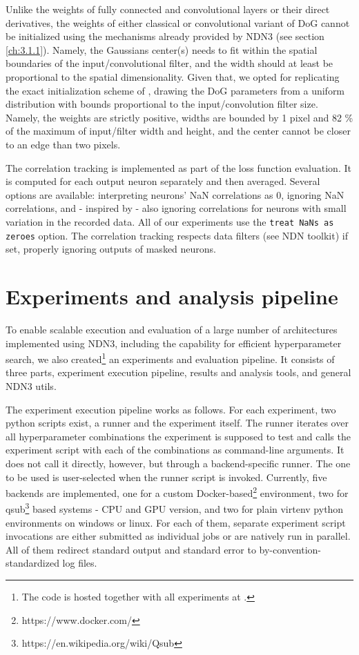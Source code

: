 Unlike the weights of fully connected and convolutional layers or their direct derivatives, the weights of either classical or convolutional variant of DoG cannot be initialized using the mechanisms already provided by NDN3 (see section \ref{ch:3.1.1}). Namely, the Gaussians center(s) needs to fit within the spatial boundaries of the input/convolutional filter, and the width should at least be proportional to the spatial dimensionality. Given that, we opted for replicating the exact initialization scheme of \citeauthor{antolik}, drawing the DoG parameters from a uniform distribution with bounds proportional to the input/convolution filter size. Namely, the weights are strictly positive, widths are bounded by 1 pixel and 82 \% of the maximum of input/filter width and height, and the center cannot be closer to an edge than two pixels. 

The correlation tracking is implemented as part of the loss function evaluation. It is computed for each output neuron separately and then averaged. Several options are available: interpreting neurons’ NaN correlations as 0, ignoring NaN correlations, and - inspired by \cite{ecker} - also ignoring correlations for neurons with small variation in the recorded data. All of our experiments use the \texttt{treat NaNs as zeroes} option. The correlation tracking respects data filters (see NDN toolkit) if set, properly ignoring outputs of masked neurons.

\section{Experiments and analysis pipeline}\label{ch:3.3}

To enable scalable execution and evaluation of a large number of architectures implemented using NDN3, including the capability for efficient hyperparameter search, we also created\footnote{The code is hosted together with all experiments at .} an experiments and evaluation pipeline. It consists of three parts, experiment execution pipeline, results and analysis tools, and general NDN3 utils.

The experiment execution pipeline works as follows. For each experiment, two python scripts exist, a runner and the experiment itself. The runner iterates over all hyperparameter combinations the experiment is supposed to test and calls the experiment script with each of the combinations as command-line arguments. It does not call it directly, however, but through a backend-specific runner. The one to be used is user-selected when the runner script is invoked. Currently, five backends are implemented, one for a custom Docker-based\footnote{https://www.docker.com/} environment, two for qsub\footnote{https://en.wikipedia.org/wiki/Qsub} based systems - CPU and GPU version, and two for plain virtenv python environments on windows or linux. For each of them, separate experiment script invocations are either submitted as individual jobs or are natively run in parallel. All of them redirect standard output and standard error to by-convention-standardized log files.

